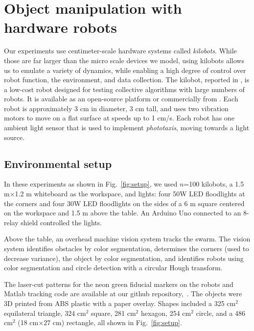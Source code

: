 
\section{Object manipulation with hardware robots}\label{sec:realExperiment}
Our experiments use centimeter-scale hardware systems called \emph{kilobots}.  While those are far larger than the micro scale devices we model, using kilobots allows us to emulate a variety of dynamics, while enabling a high degree of control over robot function, the environment, and data collection. The kilobot, reported in \cite{Rubenstein2012,rubenstein2014programmable}, is a low-cost robot designed for testing collective algorithms with large numbers of robots. It is available as an open-source platform or commercially from \cite{K-Team2015}.  Each robot is approximately 3 cm in diameter, 3 cm tall, and uses two vibration motors to move on a flat surface at speeds up to 1 cm/s.  Each robot has one ambient light sensor that is used to implement \emph{phototaxis},  moving towards a light source. 

  
\subsection{Environmental setup}  
In these experiments as shown in Fig.~\ref{fig:setup}, we used $n$=100 kilobots, a 1.5 m$\times$1.2 m whiteboard as the workspace, and lights: four 50W LED floodlights  at the corners and four 30W LED floodlights on the sides of a 6 m square centered on the workspace and 1.5 m above the table. An Arduino Uno connected to an 8-relay shield controlled the lights.  

Above the table, an overhead machine vision system tracks the swarm. The vision system identifies obstacles by color segmentation, determines the corners  (used to decrease  variance), the object by color segmentation, and identifies robots using color segmentation and circle detection with a circular Hough transform.

The laser-cut patterns for the neon green fiducial markers on the robots and {\sc Matlab} tracking code are available at our github repository,~\cite{Shahrokhi2015GitHubShapeControl}. 
The objects were 3D printed from ABS plastic with a paper overlay. 
Shapes included a 325 cm$^2$ equilateral triangle, 
 324 cm$^2$ square,
 281 cm$^2$ hexagon,
254 cm$^2$ circle, 
and a 486 cm$^2$ (18 cm$\times$27 cm)  rectangle, all shown in Fig.~\ref{fig:setup}.

